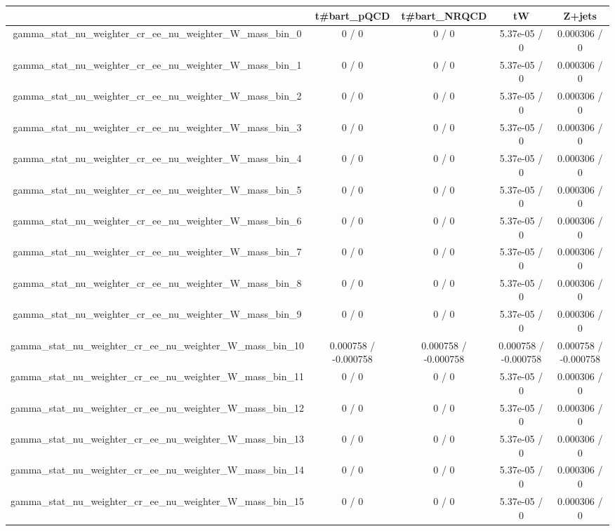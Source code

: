 \documentclass[10pt]{article}
\begin{document}
\begin{table}[htbp]
\begin{center}
\begin{tabular}{|c|c|c|c|c|}
\hline 
      & t#bar{t}_{pQCD}      & t#bar{t}_{NRQCD}      & tW      & Z+jets \\ 
\hline 
  gamma_stat_nu_weighter_cr_ee_nu_weighter_W_mass_bin_0 & 0 / 0 & 0 / 0 & 5.37e-05 / 0 & 0.000306 / 0 \\ 
  gamma_stat_nu_weighter_cr_ee_nu_weighter_W_mass_bin_1 & 0 / 0 & 0 / 0 & 5.37e-05 / 0 & 0.000306 / 0 \\ 
  gamma_stat_nu_weighter_cr_ee_nu_weighter_W_mass_bin_2 & 0 / 0 & 0 / 0 & 5.37e-05 / 0 & 0.000306 / 0 \\ 
  gamma_stat_nu_weighter_cr_ee_nu_weighter_W_mass_bin_3 & 0 / 0 & 0 / 0 & 5.37e-05 / 0 & 0.000306 / 0 \\ 
  gamma_stat_nu_weighter_cr_ee_nu_weighter_W_mass_bin_4 & 0 / 0 & 0 / 0 & 5.37e-05 / 0 & 0.000306 / 0 \\ 
  gamma_stat_nu_weighter_cr_ee_nu_weighter_W_mass_bin_5 & 0 / 0 & 0 / 0 & 5.37e-05 / 0 & 0.000306 / 0 \\ 
  gamma_stat_nu_weighter_cr_ee_nu_weighter_W_mass_bin_6 & 0 / 0 & 0 / 0 & 5.37e-05 / 0 & 0.000306 / 0 \\ 
  gamma_stat_nu_weighter_cr_ee_nu_weighter_W_mass_bin_7 & 0 / 0 & 0 / 0 & 5.37e-05 / 0 & 0.000306 / 0 \\ 
  gamma_stat_nu_weighter_cr_ee_nu_weighter_W_mass_bin_8 & 0 / 0 & 0 / 0 & 5.37e-05 / 0 & 0.000306 / 0 \\ 
  gamma_stat_nu_weighter_cr_ee_nu_weighter_W_mass_bin_9 & 0 / 0 & 0 / 0 & 5.37e-05 / 0 & 0.000306 / 0 \\ 
  gamma_stat_nu_weighter_cr_ee_nu_weighter_W_mass_bin_10 & 0.000758 / -0.000758 & 0.000758 / -0.000758 & 0.000758 / -0.000758 & 0.000758 / -0.000758 \\ 
  gamma_stat_nu_weighter_cr_ee_nu_weighter_W_mass_bin_11 & 0 / 0 & 0 / 0 & 5.37e-05 / 0 & 0.000306 / 0 \\ 
  gamma_stat_nu_weighter_cr_ee_nu_weighter_W_mass_bin_12 & 0 / 0 & 0 / 0 & 5.37e-05 / 0 & 0.000306 / 0 \\ 
  gamma_stat_nu_weighter_cr_ee_nu_weighter_W_mass_bin_13 & 0 / 0 & 0 / 0 & 5.37e-05 / 0 & 0.000306 / 0 \\ 
  gamma_stat_nu_weighter_cr_ee_nu_weighter_W_mass_bin_14 & 0 / 0 & 0 / 0 & 5.37e-05 / 0 & 0.000306 / 0 \\ 
  gamma_stat_nu_weighter_cr_ee_nu_weighter_W_mass_bin_15 & 0 / 0 & 0 / 0 & 5.37e-05 / 0 & 0.000306 / 0 \\ 

\end{tabular}
\end{center}
\end{table}
\end{document}
